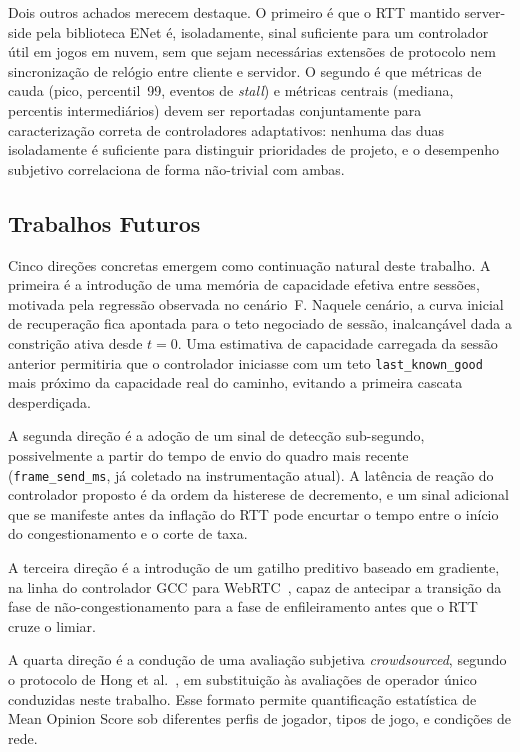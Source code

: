 Dois outros achados merecem destaque. O primeiro é que o RTT
mantido server-side pela biblioteca ENet é, isoladamente,
sinal suficiente para um controlador útil em jogos em nuvem,
sem que sejam necessárias extensões de protocolo nem
sincronização de relógio entre cliente e servidor. O segundo é
que métricas de cauda (pico, percentil~99, eventos de
\emph{stall}) e métricas centrais (mediana, percentis
intermediários) devem ser reportadas conjuntamente para
caracterização correta de controladores adaptativos: nenhuma
das duas isoladamente é suficiente para distinguir prioridades
de projeto, e o desempenho subjetivo correlaciona de forma
não-trivial com ambas.

\subsection{Trabalhos Futuros}

Cinco direções concretas emergem como continuação natural
deste trabalho. A primeira é a introdução de uma memória de
capacidade efetiva entre sessões, motivada pela regressão
observada no cenário~F. Naquele cenário, a curva inicial de
recuperação fica apontada para o teto negociado de sessão,
inalcançável dada a constrição ativa desde $t=0$. Uma
estimativa de capacidade carregada da sessão anterior
permitiria que o controlador iniciasse com um teto
\texttt{last\_known\_good} mais próximo da capacidade real do
caminho, evitando a primeira cascata desperdiçada.

A segunda direção é a adoção de um sinal de detecção
sub-segundo, possivelmente a partir do tempo de envio do
quadro mais recente (\texttt{frame\_send\_ms}, já coletado na
instrumentação atual). A latência de reação do controlador
proposto é da ordem da histerese de decremento, e um sinal
adicional que se manifeste antes da inflação do RTT pode
encurtar o tempo entre o início do congestionamento e o corte
de taxa.

A terceira direção é a introdução de um gatilho preditivo
baseado em gradiente, na linha do controlador GCC para
WebRTC~\cite{gcc}, capaz de antecipar a transição da fase de
não-congestionamento para a fase de enfileiramento antes que
o RTT cruze o limiar.

A quarta direção é a condução de uma avaliação subjetiva
\emph{crowdsourced}, segundo o protocolo de Hong et
al.~\cite{hong2015}, em substituição às avaliações de
operador único conduzidas neste trabalho. Esse formato
permite quantificação estatística de Mean Opinion Score sob
diferentes perfis de jogador, tipos de jogo, e condições de
rede.

